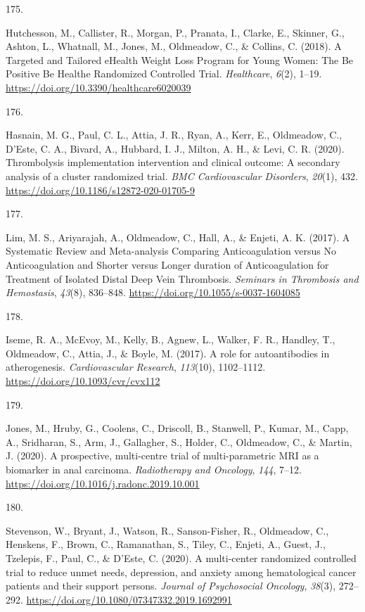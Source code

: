\documentclass[11pt, a4paper]{awesome-cv}
\newlength{\csllabelwidth}
\newcommand{\CSLLeftMargin}[1]{\parbox[t]{\csllabelwidth}{#1}}
\newcommand{\CSLRightInline}[1]{\parbox[t]{\linewidth - \csllabelwidth}{#1}}
\begin{document}
\leavevmode\hypertarget{ref-hutchesson_targeted_2018}{}%
\CSLLeftMargin{175. }
\CSLRightInline{Hutchesson, M., Callister, R., Morgan, P., Pranata, I.,
Clarke, E., Skinner, G., Ashton, L., Whatnall, M., Jones, M., Oldmeadow,
C., \& Collins, C. (2018). A Targeted and Tailored eHealth Weight Loss
Program for Young Women: The Be Positive Be Healthe Randomized
Controlled Trial. \emph{Healthcare}, \emph{6}(2), 1--19.
\url{https://doi.org/10.3390/healthcare6020039}}

\leavevmode\hypertarget{ref-hasnain_thrombolysis_2020}{}%
\CSLLeftMargin{176. }
\CSLRightInline{Hasnain, M. G., Paul, C. L., Attia, J. R., Ryan, A.,
Kerr, E., Oldmeadow, C., D'Este, C. A., Bivard, A., Hubbard, I. J.,
Milton, A. H., \& Levi, C. R. (2020). Thrombolysis implementation
intervention and clinical outcome: A secondary analysis of a cluster
randomized trial. \emph{BMC Cardiovascular Disorders}, \emph{20}(1),
432. \url{https://doi.org/10.1186/s12872-020-01705-9}}

\leavevmode\hypertarget{ref-lim_systematic_2017}{}%
\CSLLeftMargin{177. }
\CSLRightInline{Lim, M. S., Ariyarajah, A., Oldmeadow, C., Hall, A., \&
Enjeti, A. K. (2017). A Systematic Review and Meta-analysis Comparing
Anticoagulation versus No Anticoagulation and Shorter versus Longer
duration of Anticoagulation for Treatment of Isolated Distal Deep Vein
Thrombosis. \emph{Seminars in Thrombosis and Hemostasis}, \emph{43}(8),
836--848. \url{https://doi.org/10.1055/s-0037-1604085}}

\leavevmode\hypertarget{ref-iseme_role_2017}{}%
\CSLLeftMargin{178. }
\CSLRightInline{Iseme, R. A., McEvoy, M., Kelly, B., Agnew, L., Walker,
F. R., Handley, T., Oldmeadow, C., Attia, J., \& Boyle, M. (2017). A
role for autoantibodies in atherogenesis. \emph{Cardiovascular
Research}, \emph{113}(10), 1102--1112.
\url{https://doi.org/10.1093/cvr/cvx112}}

\leavevmode\hypertarget{ref-jones_prospective_2020}{}%
\CSLLeftMargin{179. }
\CSLRightInline{Jones, M., Hruby, G., Coolens, C., Driscoll, B.,
Stanwell, P., Kumar, M., Capp, A., Sridharan, S., Arm, J., Gallagher,
S., Holder, C., Oldmeadow, C., \& Martin, J. (2020). A prospective,
multi-centre trial of multi-parametric MRI as a biomarker in anal
carcinoma. \emph{Radiotherapy and Oncology}, \emph{144}, 7--12.
\url{https://doi.org/10.1016/j.radonc.2019.10.001}}

\leavevmode\hypertarget{ref-stevenson_multi-center_2020}{}%
\CSLLeftMargin{180. }
\CSLRightInline{Stevenson, W., Bryant, J., Watson, R., Sanson-Fisher,
R., Oldmeadow, C., Henskens, F., Brown, C., Ramanathan, S., Tiley, C.,
Enjeti, A., Guest, J., Tzelepis, F., Paul, C., \& D'Este, C. (2020). A
multi-center randomized controlled trial to reduce unmet needs,
depression, and anxiety among hematological cancer patients and their
support persons. \emph{Journal of Psychosocial Oncology}, \emph{38}(3),
272--292. \url{https://doi.org/10.1080/07347332.2019.1692991}}
\end{document}
